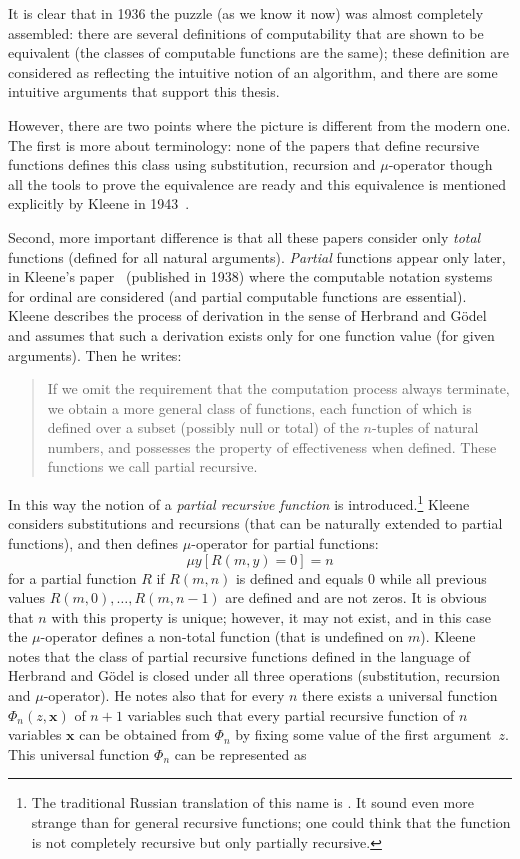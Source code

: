 \documentclass[12pt]{article}
\theoremstyle{remark}
\begin{document}
It is clear that in 1936 the puzzle (as we know it now) was almost completely assembled: there are several definitions of computability that are shown to be equivalent (the classes of computable functions are the same); these definition are considered as reflecting the intuitive notion of an algorithm, and there are some intuitive arguments that support this thesis.

However, there are two points where the picture is different from the modern one. The first is more about terminology: none of the papers that define recursive functions defines this class using substitution, recursion and $\mu$-operator though all the tools to prove the equivalence are ready and this equivalence is mentioned explicitly by Kleene in 1943~\cite[p.~53, Corollary]{Kleene1943}.

Second, more important difference is that all these papers consider only \emph{total} functions (defined for all natural arguments). \emph{Partial} functions appear only later, in Kleene's paper~\cite{Kleene1938} (published in 1938) where the computable notation systems for ordinal are considered (and partial computable functions are essential). Kleene describes the process of derivation in the sense of Herbrand and G\"{o}del and assumes that such a derivation exists only for one function value (for given arguments). Then he writes:
\begin{quote}
If we omit the requirement that the computation process always terminate, we obtain a more general class of functions, each function of which is defined over a subset (possibly null or total) of the $n$-tuples of natural numbers, and possesses the property of effectiveness when defined. These functions we call partial recursive.
\end{quote}
 In this way the notion of a \emph{partial recursive function} is introduced.\footnote{The traditional Russian translation of this name is . It sound even more strange than  for general recursive functions; one could think that the function is not completely recursive but only partially recursive.} Kleene considers substitutions and recursions (that can be naturally extended to partial functions), and then defines $\mu$-operator for partial functions:
\[
\mu y [R(m,y)=0] = n
\]
for a partial function $R$ if $R(m,n)$ is defined and equals $0$ while all previous values $R(m,0),\ldots,R(m,n-1)$ are defined and are not zeros. It is obvious that $n$ with this property is unique; however, it may not exist, and in this case the $\mu$-operator defines a non-total function (that is undefined on $m$). Kleene notes that the class of partial recursive functions defined in the language of Herbrand and G\"{o}del is closed under all three operations (substitution, recursion and $\mu$-operator). He notes also that for every $n$ there exists a universal function $\Phi_n(z,\mathbf{x})$ of $n+1$ variables such that every partial recursive function of $n$ variables $\mathbf{x}$ can be obtained from $\Phi_n$ by fixing some value of the first argument~$z$. This universal function $\Phi_n$ can be represented as
\end{document}

